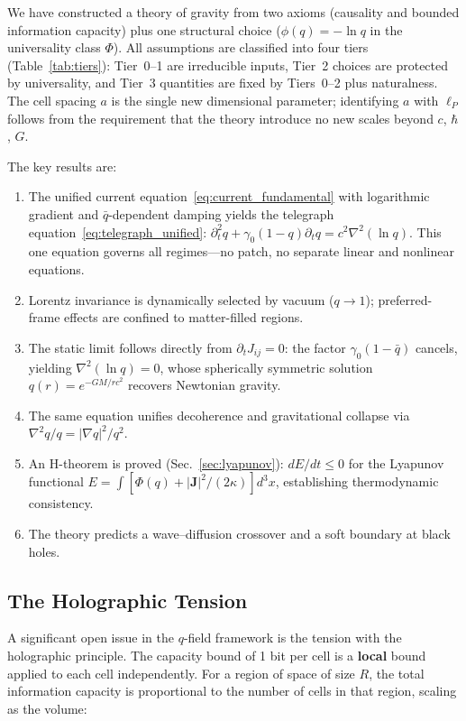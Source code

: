 \documentclass[aps,prd,twocolumn,showpacs,superscriptaddress,preprintnumbers]{revtex4-2}
\begin{document}
We have constructed a theory of gravity from two axioms (causality and bounded information capacity) plus one structural choice ($\phi(q)=-\ln q$ in the universality class $\Phi$).
All assumptions are classified into four tiers (Table~\ref{tab:tiers}): Tier~0--1 are irreducible inputs, Tier~2 choices are protected by universality, and Tier~3 quantities are fixed by Tiers~0--2 plus naturalness.
The cell spacing $a$ is the single new dimensional parameter; identifying $a$ with $\ell_P$ follows from the requirement that the theory introduce no new scales beyond $c$, $\hbar$, $G$.

The key results are:

\begin{enumerate}
    \item The unified current equation~\eqref{eq:current_fundamental} with logarithmic gradient and $\bar{q}$-dependent damping yields the telegraph equation~\eqref{eq:telegraph_unified}: $\partial_t^2 q + \gamma_0(1-q)\partial_t q = c^2\nabla^2(\ln q)$. This one equation governs all regimes---no patch, no separate linear and nonlinear equations.
    \item Lorentz invariance is dynamically selected by vacuum ($q\to1$); preferred-frame effects are confined to matter-filled regions.
    \item The static limit follows directly from $\partial_t J_{ij}=0$: the factor $\gamma_0(1-\bar{q})$ cancels, yielding $\nabla^2(\ln q)=0$, whose spherically symmetric solution $q(r)=e^{-GM/rc^2}$ recovers Newtonian gravity.
    \item The same equation unifies decoherence and gravitational collapse via $\nabla^2 q/q = |\nabla q|^2/q^2$.
    \item An H-theorem is proved (Sec.~\ref{sec:lyapunov}): $dE/dt\leq0$ for the Lyapunov functional $E=\int[\Phi(q)+|\mathbf{J}|^2/(2\kappa)]d^3x$, establishing thermodynamic consistency.
    \item The theory predicts a wave--diffusion crossover and a soft boundary at black holes.
\end{enumerate}

\subsection{The Holographic Tension}
\label{sec:holographic}

A significant open issue in the $q$-field framework is the tension with the holographic principle.
The capacity bound of 1 bit per cell is a \textbf{local} bound applied to each cell independently.
For a region of space of size $R$, the total information capacity is proportional to the number of cells in that region, scaling as the volume:
\end{document}
